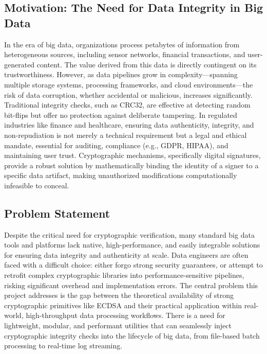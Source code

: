 \documentclass[12pt, letterpaper]{article}
\begin{document}
	\subsection{Motivation: The Need for Data Integrity in Big Data}
	In the era of big data, organizations process petabytes of information from heterogeneous sources, including sensor networks, financial transactions, and user-generated content. The value derived from this data is directly contingent on its trustworthiness. However, as data pipelines grow in complexity---spanning multiple storage systems, processing frameworks, and cloud environments---the risk of data corruption, whether accidental or malicious, increases significantly. Traditional integrity checks, such as CRC32, are effective at detecting random bit-flips but offer no protection against deliberate tampering. In regulated industries like finance and healthcare, ensuring data authenticity, integrity, and non-repudiation is not merely a technical requirement but a legal and ethical mandate, essential for auditing, compliance (e.g., GDPR, HIPAA), and maintaining user trust. Cryptographic mechanisms, specifically digital signatures, provide a robust solution by mathematically binding the identity of a signer to a specific data artifact, making unauthorized modifications computationally infeasible to conceal.
	
	\subsection{Problem Statement}
	Despite the critical need for cryptographic verification, many standard big data tools and platforms lack native, high-performance, and easily integrable solutions for ensuring data integrity and authenticity at scale. Data engineers are often faced with a difficult choice: either forgo strong security guarantees, or attempt to retrofit complex cryptographic libraries into performance-sensitive pipelines, risking significant overhead and implementation errors. The central problem this project addresses is the gap between the theoretical availability of strong cryptographic primitives like ECDSA and their practical application within real-world, high-throughput data processing workflows. There is a need for lightweight, modular, and performant utilities that can seamlessly inject cryptographic integrity checks into the lifecycle of big data, from file-based batch processing to real-time log streaming.
	
\end{document}
